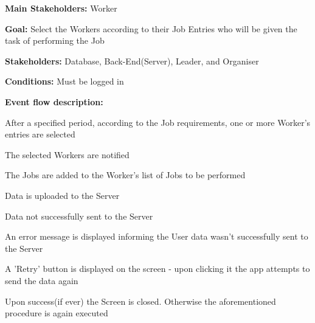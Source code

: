 			\noindent {}
			\begin{packed_item}
				\item \textbf{Main Stakeholders:} Worker
				\item \textbf{Goal:} Select the Workers according to their Job Entries who will be given the task of performing the Job
				\item \textbf{Stakeholders: } Database, Back-End(Server), Leader, and Organiser
				\item \textbf{Conditions: } Must be logged in
				\item \textbf{Event flow description: }
				\begin{packed_enum}
					\item After a specified period, according to the Job requirements, one or more Worker's entries are selected
					\item The selected Workers are notified
					\item The Jobs are added to the Worker's list of Jobs to be performed
					\item Data is uploaded to the Server
				\end{packed_enum}
				
				\begin{packed_item}
					\item[4.a] Data not successfully sent to the Server
					\item[] \begin{packed_enum}
						\item An error message is displayed informing the User data wasn't successfully sent to the Server
						\item A 'Retry' button is displayed on the screen - upon clicking it the app attempts to send the data again
						\item Upon success(if ever) the Screen is closed. Otherwise the aforementioned procedure is again executed
					\end{packed_enum}
				\end{packed_item}
			\end{packed_item}
		
